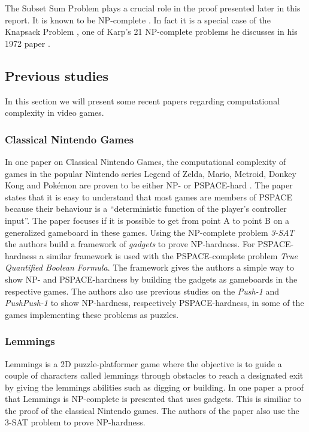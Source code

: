 The Subset Sum Problem plays a crucial role in the proof presented later in this report. It is known to be NP-complete \cite[p.~492]{algorithm}. In fact it is a special case of the Knapsack Problem \cite[p.~491]{algorithm}, one of Karp's 21 NP-complete problems he discusses in his 1972 paper \cite{karp}.

\subsection{Previous studies}

In this section we will present some recent papers regarding computational complexity in video games.

\subsubsection{Classical Nintendo Games}

In one paper on Classical Nintendo Games, the computational complexity of games in the popular Nintendo series Legend of Zelda, Mario, Metroid, Donkey Kong and Pokémon are proven to be either NP- or PSPACE-hard \cite{classic}. The paper states that it is easy to understand that most games are members of PSPACE because their behaviour is a ``deterministic function of the player's controller input''. The paper focuses if it is possible to get from point A to point B on a generalized gameboard in these games. Using the NP-complete problem \textit{3-SAT} the authors build a framework of \textit{gadgets} to prove NP-hardness. For PSPACE-hardness a similar framework is used with the PSPACE-complete problem \textit{True Quantified Boolean Formula}. The framework gives the authors a simple way to show NP- and PSPACE-hardness by building the gadgets as gameboards in the respective games. The authors also use previous studies on the \textit{Push-1} \cite{push1} and \textit{PushPush-1} \cite{pushpushk} to show NP-hardness, respectively PSPACE-hardness, in some of the games implementing these problems as puzzles. 

\subsubsection{Lemmings}

Lemmings is a 2D puzzle-platformer game where the objective is to guide a couple of characters called lemmings through obstacles to reach a designated exit by giving the lemmings abilities such as digging or building. In one paper a proof that Lemmings is NP-complete is presented that uses gadgets. This is similiar to the proof of the classical Nintendo games. The authors of the paper also use the 3-SAT problem to prove NP-hardness. 

